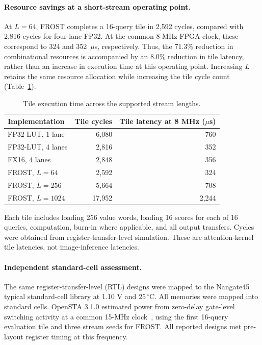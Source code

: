 \paragraph{Resource savings at a short-stream operating point.}
At $L=64$, FROST completes a 16-query tile in 2,592 cycles, compared
with 2,816 cycles for four-lane FP32. At the common 8-MHz FPGA clock,
these correspond to 324 and 352~$\mu$s, respectively. Thus, the
71.3\% reduction in combinational resources is accompanied by an
8.0\% reduction in tile latency, rather than an increase in execution
time at this operating point. Increasing $L$ retains the same resource
allocation while increasing the tile cycle count
(Table~\ref{tab:fused_cycles}).

\begin{table}[!htbp]
\centering
\caption{Tile execution time across the supported stream lengths.}
\label{tab:fused_cycles}
\small
\setlength{\tabcolsep}{4pt}
\begin{tabular*}{\linewidth}{@{\extracolsep{\fill}}lrr@{}}
\toprule
Implementation & Tile cycles & Tile latency at 8 MHz ($\mu$s) \\
\midrule
FP32-LUT, 1 lane & 6,080 & 760 \\
FP32-LUT, 4 lanes & 2,816 & 352 \\
FX16, 4 lanes & 2,848 & 356 \\
FROST, $L=64$ & 2,592 & 324 \\
FROST, $L=256$ & 5,664 & 708 \\
FROST, $L=1024$ & 17,952 & 2,244 \\
\bottomrule
\end{tabular*}
\par\smallskip\footnotesize
Each tile includes loading 256 value words, loading 16 scores for each
of 16 queries, computation, burn-in where applicable, and all output
transfers. Cycles were obtained from register-transfer-level simulation.
These are attention-kernel tile latencies, not image-inference latencies.
\end{table}

\paragraph{Independent standard-cell assessment.}
The same register-transfer-level (RTL) designs were mapped to the
Nangate45 typical standard-cell library at 1.10 V and $25\,^{\circ}$C.
All memories were mapped into standard cells. OpenSTA 3.1.0 estimated
power from zero-delay gate-level switching activity at a common
15-MHz clock~\cite{openstaSoftware}, using the first 16-query evaluation
tile and three stream seeds for FROST. All reported designs met
pre-layout register timing at this frequency.

